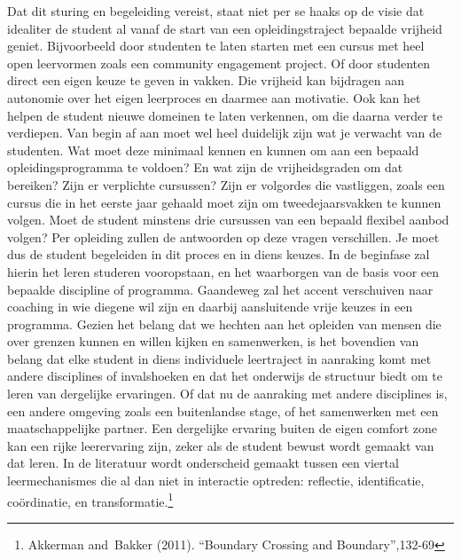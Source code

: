 \documentclass{jote-book}
\begin{document}
	Dat dit sturing en begeleiding vereist, staat niet per se haaks op de visie dat idealiter de student al vanaf de start van een opleidingstraject bepaalde vrijheid geniet. Bijvoorbeeld door studenten te laten starten met een cursus met heel open leervormen zoals een community engagement project. Of door studenten direct een eigen keuze te geven in vakken. Die vrijheid kan bijdragen aan autonomie over het eigen leerproces en daarmee aan motivatie. Ook kan het helpen de student nieuwe domeinen te laten verkennen, om die daarna verder te verdiepen. Van begin af aan moet wel heel duidelijk zijn wat je verwacht van de studenten. Wat moet deze minimaal kennen en kunnen om aan een bepaald opleidingsprogramma te voldoen? En wat zijn de vrijheidsgraden om dat bereiken? Zijn er verplichte cursussen? Zijn er volgordes die vastliggen, zoals een cursus die in het eerste jaar gehaald moet zijn om tweedejaarsvakken te kunnen volgen. Moet de student minstens drie cursussen van een bepaald flexibel aanbod volgen? Per opleiding zullen de antwoorden op deze vragen verschillen. Je moet dus de student begeleiden in dit proces en in diens keuzes. In de beginfase zal hierin het leren studeren vooropstaan, en het waarborgen van de basis voor een bepaalde discipline of programma. Gaandeweg zal het accent verschuiven naar coaching in wie diegene wil zijn en daarbij aansluitende vrije keuzes in een programma. Gezien het belang dat we hechten aan het opleiden van mensen die over grenzen kunnen en willen kijken en samenwerken, is het bovendien van belang dat elke student in diens individuele leertraject in aanraking komt met andere disciplines of invalshoeken en dat het onderwijs de structuur biedt om te leren van dergelijke ervaringen. Of dat nu de aanraking met andere disciplines is, een andere omgeving zoals een buitenlandse stage, of het samenwerken met een maatschappelijke partner. Een dergelijke ervaring buiten de eigen comfort zone kan een rijke leerervaring zijn, zeker als de student bewust wordt gemaakt van dat leren. In de literatuur wordt onderscheid gemaakt tussen een viertal leermechanismes die al dan niet in interactie optreden: reflectie, identificatie, coördinatie, en transformatie.\footnote{Akkerman and Bakker (2011). “Boundary Crossing and Boundary”,132-69}
\end{document}
